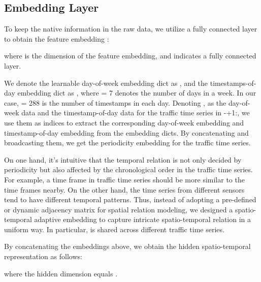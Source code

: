 \documentclass[sigconf]{acmart}
\begin{document}
\subsection{Embedding Layer}
To keep the native information in the raw data, we utilize a fully connected layer to obtain the feature embedding :

\noindent where  is the dimension of the feature embedding, and  indicates a fully connected layer.







We denote the learnable day-of-week embedding dict as , and the timestamps-of-day embedding dict as , where  = 7 denotes the number of days in a week. In our case,  = 288 is the number of timestamps in each day. Denoting ,  as the day-of-week data and the timestamp-of-day data for the traffic time series in -+1:, we use them as indices to extract the corresponding day-of-week embedding  and timestamp-of-day embedding  from the embedding dicts. By concatenating and broadcasting them, we get the periodicity embedding  for the traffic time series.

On one hand, it's intuitive that the temporal relation is not only decided by periodicity but also affected by the chronological order in the traffic time series. For example, a time frame in traffic time series should be more similar to the time frames nearby. On the other hand, the time series from different sensors tend to have different temporal patterns. Thus, instead of adopting a pre-defined or dynamic adjacency matrix for spatial relation modeling, we designed a spatio-temporal adaptive embedding  to capture intricate spatio-temporal relation in a uniform way. In particular,  is shared across different traffic time series.

By concatenating the embeddings above, we obtain the hidden spatio-temporal representation  as follows:

where the hidden dimension  equals .
\end{document}
